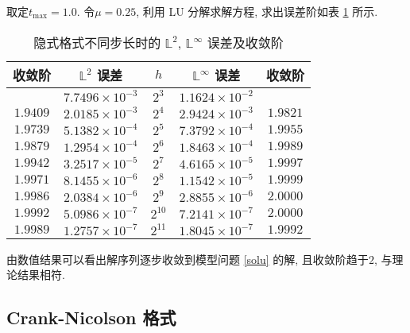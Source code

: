 \documentclass[UTF8, a4paper, 12pt, oneside, onecolumn]{article}
\begin{document}
取定$t_{\max} = 1.0$. 令$\mu = 0.25$, 利用 LU 分解求解方程, 求出误差阶如表 \ref{tab:imexpliciterr2} 所示.
\begin{table}[H]\centering\heiti{}
	\caption{隐式格式不同步长时的 $\mathbb{L}^2$, $\mathbb{L}^\infty$ 误差及收敛阶}\label{tab:imexpliciterr2}
	\begin{tabular}{|c|c|c|c|c|}\hline
		收敛阶	&	$\mathbb{L}^2$ 误差	&	$h$	&	$\mathbb{L}^\infty$ 误差		&	收敛阶\\\hline
			&	$7.7496 \times 10^{-3}$	&	$2^3$	&	$1.1624 \times 10^{-2}$	&	\\\hline
		$1.9409$	&	$2.0185 \times 10^{-3}$	&	$2^4$	&	$2.9424 \times 10^{-3}$	&	$1.9821$\\\hline
		$1.9739$	&	$5.1382 \times 10^{-4}$	&	$2^5$	&	$7.3792 \times 10^{-4}$	&	$1.9955$\\\hline
		$1.9879$	&	$1.2954 \times 10^{-4}$	&	$2^6$	&	$1.8463 \times 10^{-4}$	&	$1.9989$\\\hline
		$1.9942$	&	$3.2517 \times 10^{-5}$	&	$2^7$	&	$4.6165 \times 10^{-5}$	&	$1.9997$\\\hline
		$1.9971$	&	$8.1455 \times 10^{-6}$	&	$2^8$	&	$1.1542 \times 10^{-5}$	&	$1.9999$\\\hline
		$1.9986$	&	$2.0384 \times 10^{-6}$	&	$2^9$	&	$2.8855 \times 10^{-6}$	&	$2.0000$\\\hline
		$1.9992$	&	$5.0986 \times 10^{-7}$	&	$2^{10}$	&	$7.2141 \times 10^{-7}$	&	$2.0000$\\\hline
		$1.9989$	&	$1.2757 \times 10^{-7}$	&	$2^{11}$	&	$1.8045 \times 10^{-7}$	&	$1.9992$\\\hline
	\end{tabular}
\end{table}

由数值结果可以看出解序列逐步收敛到模型问题 \eqref{solu} 的解, 且收敛阶趋于$2$, 与理论结果相符.

\subsection{Crank-Nicolson 格式}
\end{document}
